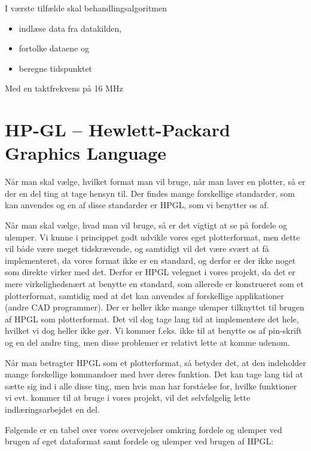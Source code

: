 I værste tilfælde skal behandlingsalgoritmen
\begin{itemize}
\item indlæse data fra datakilden,
\item fortolke dataene og
\item beregne tidspunktet
\end{itemize}

Med en taktfrekvens på 16 MHz


\section{HP-GL -- Hewlett-Packard Graphics Language}

Når man skal vælge, hvilket format man vil bruge, når man laver en
plotter, så er der en del ting at tage hensyn til. Der findes mange
forskellige standarder, som kan anvendes og en af disse standarder er
HPGL, som vi benytter os af.

Når man skal vælge, hvad man vil bruge, så er det vigtigt at se på
fordele og ulemper. Vi kunne i princippet godt udvikle vores eget
plotterformat, men dette vil både være meget tidskrævende, og
samtidigt vil det være svært at få implementeret, da vores format ikke
er en standard, og derfor er der ikke noget som direkte virker med
det. Derfor er HPGL velegnet i vores projekt, da det er mere
virkelighedsnært at benytte en standard, som allerede er konstrueret
som et plotterformat, samtidig med at det kan anvendes af forskellige
applikationer (andre CAD programmer). Der er heller ikke mange ulemper
tilknyttet til brugen af HPGL som plotterformat. Det vil dog tage lang
tid at implementere det hele, hvilket vi dog heller ikke gør. Vi
kommer f.eks. ikke til at benytte os af pin-skrift og en del andre
ting, men disse problemer er relativt lette at komme udenom.

Når man betragter HPGL som et plotterformat, så betyder det, at den
indeholder mange forskellige kommandoer med hver deres funktion. Det
kan tage lang tid at sætte sig ind i alle disse ting, men hvis man har
forståelse for, hvilke funktioner vi evt. kommer til at bruge i vores
projekt, vil det selvfølgelig lette indlæringsarbejdet en del.

Følgende er en tabel over vores overvejelser omkring fordele og
ulemper ved brugen af eget dataformat samt fordele og ulemper ved
brugen af HPGL:


